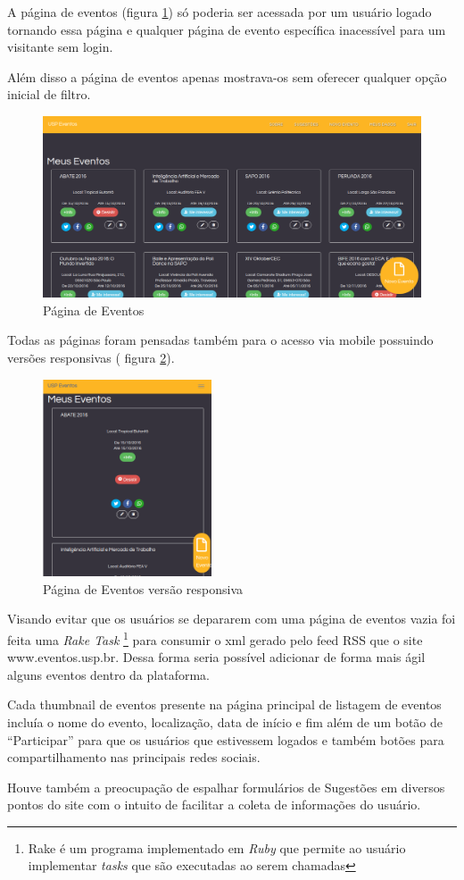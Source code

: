 		\par A página de eventos (figura \ref{fig:events_pagev1}) só poderia ser acessada por um usuário logado tornando essa página e qualquer página de evento específica inacessível para um visitante sem login.
        \par Além disso a página de eventos apenas mostrava-os sem oferecer qualquer opção inicial de filtro.
        \begin{figure}[htb]
		\includegraphics[width=15cm]{figuras/events_pagev1}
		\caption{\label{fig:events_pagev1} Página de Eventos}
		\end{figure}
\par Todas as páginas foram pensadas também para o acesso via mobile possuindo versões responsivas ( figura \ref{fig:events_pagev1_responsive}).
        \begin{figure}[htb]
		\includegraphics[width=5cm]{figuras/events_pagev1_responsive}
		\caption{\label{fig:events_pagev1_responsive} Página de Eventos versão responsiva}
		\end{figure}
\par Visando evitar que os usuários se depararem com uma página de eventos vazia foi feita uma \emph{Rake Task} \footnote{Rake é um programa implementado em \emph{Ruby} que permite ao usuário implementar \emph{tasks} que são executadas ao serem chamadas} para consumir o xml gerado pelo feed RSS que o site www.eventos.usp.br. Dessa forma seria possível adicionar de forma mais ágil alguns eventos dentro da plataforma.
\par Cada thumbnail de eventos presente na página principal de listagem de eventos incluía o nome do evento, localização, data de início e fim além de um botão de ``Participar'' para que os usuários que estivessem logados e também botões para compartilhamento nas principais redes sociais.
\par Houve também a preocupação de espalhar formulários de Sugestões em diversos pontos do site com o intuito de facilitar a coleta de informações do usuário.
